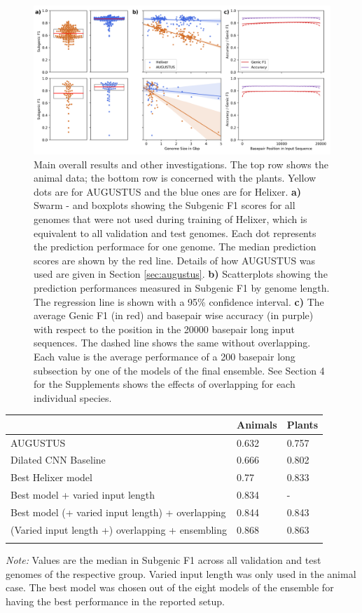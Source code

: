 \documentclass{bioinfo}
\begin{document}
\begin{figure}[!tpb]
\label{fig:main_results}
\centerline{\includegraphics[width=\textwidth]{images/main_results}}
\caption{Main overall results and other investigations. The top row shows the animal
 data; the bottom row is concerned with the plants. Yellow dots are for AUGUSTUS and 
the blue ones are for Helixer. {\bf a)} Swarm - and boxplots showing the Subgenic F1 
scores for all genomes that were not used during training of Helixer, which is 
equivalent to all validation and test genomes. Each dot represents the prediction 
performace for one genome. The median prediction scores are shown by the red line. 
Details of how AUGUSTUS was used are given in Section \ref{sec:augustus}. {\bf b)} 
Scatterplots showing the prediction performances measured in Subgenic F1 by genome 
length. The regression line is shown with a 95\% confidence interval. {\bf c)} The 
average Genic F1 (in red) and basepair wise accuracy (in purple) with respect to 
the position in the 20000 basepair long input sequences. The dashed line shows the 
same without overlapping. Each value is the average performance of a 200 basepair 
long subsection by one of the models of the final ensemble. See Section 4 for the 
Supplements shows the effects of overlapping for each individual species.}
\end{figure}

\begin{table}[!t]
 {
\begin{tabular}{@{}lll@{}}
\toprule & Animals & Plants\\
\midrule
AUGUSTUS & 0.632 & 0.757 \\
Dilated CNN Baseline & 0.666 &  0.802 \\
Best Helixer model & 0.77  & 0.833  \\
Best model + varied input length & 0.834  & - \\
Best model (+ varied input length) + overlapping &  0.844  & 0.843  \\
(Varied input length +) overlapping + ensembling & 0.868  & 0.863  \\
\botrule
\end{tabular}}{{\it Note:} Values are the median in Subgenic F1 across all 
validation and test genomes of the respective group. Varied input length was only 
used in the animal case. The best model was chosen out of the eight models of the 
ensemble for having the best performance in the reported setup.}
\end{table}
\end{document}
